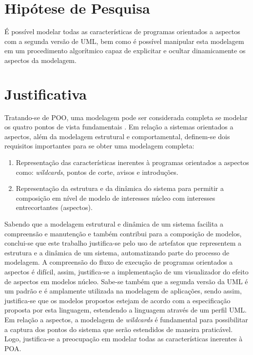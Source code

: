 \section{Hipótese de Pesquisa}

É possível modelar todas as características de programas orientados a aspectos com a segunda versão de UML, bem como é possível manipular esta
modelagem em um procedimento algorítmico capaz de explicitar e ocultar dinamicamente os aspectos da modelagem.

\section{Justificativa}

Tratando-se de POO, uma modelagem pode ser considerada completa se modelar os quatro pontos de vista fundamentais \cite{silva:00}. Em relação a
sistemas orientados a aspectos, além da modelagem estrutural e comportamental, definem-se dois requisitos importantes para se obter uma modelagem
completa:

\begin{enumerate}
  \item Representação das características inerentes à programas orientados a aspectos como: \textit{wildcards}, pontos de corte, avisos e
  introduções. 
  \item Representação da estrutura e da dinâmica do sistema para permitir a composição em nível de modelo de interesses núcleo com interesses
  entrecortantes (aspectos).
\end{enumerate}

Sabendo que a modelagem estrutural e dinâmica de um sistema facilita a compreensão e manutenção e também contribui para a composição de modelos,
conclui-se que este trabalho justifica-se pelo uso de artefatos que representem a estrutura e a dinâmica de um sistema, automatizando parte do processo de modelagem. 
A compreensão do fluxo de execução de programas orientados a aspectos é difícil, assim, justifica-se a implementação de um visualizador do efeito de
aspectos em modelos núcleo. Sabe-se também que a segunda versão da UML é um padrão e é amplamente utilizada na modelagem de aplicações, sendo assim,
justifica-se que os modelos propostos estejam de acordo com a especificação proposta por esta linguagem, estendendo a linguagem através de um perfil UML. Em 
relação a aspectos, a modelagem de \textit{wildcards} é fundamental para possibilitar a captura dos pontos do sistema que serão estendidos de maneira
praticável. Logo, justifica-se a preocupação em modelar todas as características inerentes à POA.

